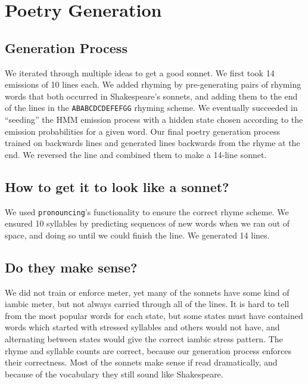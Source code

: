 \section{Poetry Generation}
\subsection{Generation Process}
We iterated through multiple ideas to get a good sonnet. We first took 14 emissions of 10 lines each. We added rhyming by pre-generating pairs of rhyming words that both occurred in Shakespeare's sonnets, and adding them to the end of the lines in the {\tt ABABCDCDEFEFGG} rhyming scheme. We eventually succeeded in ``seeding'' the HMM emission process with a hidden state chosen according to the emission probabilities for a given word. Our final poetry generation process trained on backwards lines and generated lines backwards from the rhyme at the end. We reversed the line and combined them to make a 14-line sonnet.
\subsection{How to get it to look like a sonnet?}
We used {\tt pronouncing}'s functionality to ensure the correct rhyme scheme. We ensured 10 syllables by predicting sequences of new words when we ran out of space, and doing so until we could finish the line. We generated 14 lines.
\subsection{Do they make sense?}
We did not train or enforce meter, yet many of the sonnets have some kind of iambic meter, but not always carried through all of the lines. It is hard to tell from the most popular words for each state, but some states must have contained words which started with stressed syllables and others would not have, and alternating between states would give the correct iambic stress pattern. The rhyme and syllable counts are correct, because our generation process enforces their correctness. Most of the sonnets make sense if read dramatically, and because of the vocabulary they still sound like Shakespeare.  

